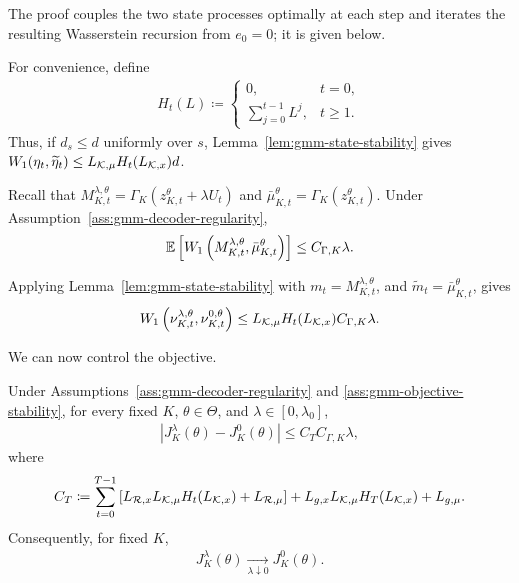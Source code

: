 The proof couples the two state processes optimally at each step and iterates the resulting Wasserstein recursion from $e_0=0$; it is given below.

For convenience, define
\begin{align}
    H_t(L) \coloneqq
    \begin{cases}
        0, &t=0, \\ \displaystyle \sum_{j=0}^{t-1}L^j, &t\geq1.
    \end{cases}
    \label{eq:gmm-geometric-factor}
\end{align}
Thus, if $d_s\leq d$ uniformly over $s$, Lemma~\ref{lem:gmm-state-stability} gives $W_1(\eta_t,\widetilde\eta_t) \leq L_{{\cal K},\mu} H_t(L_{{\cal K},x})d$.

Recall that $M_{K,t}^{\lambda,\theta} = \Gamma_K \left( z_{K,t}^\theta+\lambda U_t \right)$ and $\bar\mu_{K,t}^\theta = \Gamma_K(z_{K,t}^\theta)$. Under Assumption~\ref{ass:gmm-decoder-regularity},
\begin{align}
    \mathbb{E} \left[ W_1 \left( M_{K,t}^{\lambda,\theta}, \bar\mu_{K,t}^\theta \right) \right] \leq C_{\Gamma,K}\lambda.
    \label{eq:gmm-perturbation-distance-recall}
\end{align}

Applying Lemma~\ref{lem:gmm-state-stability} with $m_t=M_{K,t}^{\lambda,\theta}$, and $\widetilde m_t=\bar\mu_{K,t}^\theta$, gives
\begin{align}
    W_1 \left( \nu_{K,t}^{\lambda,\theta}, \nu_{K,t}^{0,\theta} \right) \leq L_{{\cal K},\mu} H_t(L_{{\cal K},x}) C_{\Gamma,K}\lambda.
    \label{eq:gmm-perturbed-state-to-unperturbed-gmm}
\end{align}

We can now control the objective.
\begin{proposition}
    \label{prop:gmm-perturbation-objective}
    Under Assumptions~\ref{ass:gmm-decoder-regularity} and \ref{ass:gmm-objective-stability}, for every fixed $K$, $\theta\in\Theta$, and $\lambda\in[0,\lambda_0]$,
    \begin{align}
        \left| J_K^\lambda(\theta) - J_K^0(\theta) \right| \leq C_T C_{\Gamma,K}\lambda, \label{eq:gmm-perturbation-objective-bound}
    \end{align}
    where
    \begin{align}
        C_T \coloneqq \sum_{t=0}^{T-1} \left[ L_{{\cal R},x} L_{{\cal K},\mu} H_t(L_{{\cal K},x}) + L_{{\cal R},\mu} \right] + L_{g,x} L_{{\cal K},\mu} H_T(L_{{\cal K},x}) + L_{g,\mu}.
        \label{eq:gmm-objective-stability-constant-app}
    \end{align}
    Consequently, for fixed $K$,
    \begin{align}
        J_K^\lambda(\theta) \xrightarrow[\lambda\downarrow0]{} J_K^0(\theta).
    \end{align}
\end{proposition}

